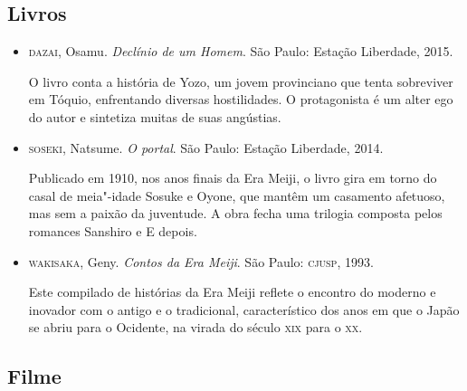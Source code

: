 \documentclass[12pt]{extarticle}
\begin{document}
\subsection{Livros}

\begin{itemize} \item\textsc{dazai}, Osamu. \textit{Declínio de um Homem}. São
      Paulo: Estação Liberdade, 2015.

O livro conta a história de Yozo, um jovem provinciano que tenta sobreviver em
    Tóquio, enfrentando diversas hostilidades. O protagonista é um alter ego do
    autor e sintetiza muitas de suas angústias.

\item\textsc{soseki}, Natsume. \textit{O portal}. São Paulo: Estação Liberdade,
  2014.

Publicado em 1910, nos anos finais da Era Meiji, o livro gira em torno do casal
    de meia"-idade Sosuke e Oyone, que mantêm um casamento afetuoso, mas sem a
    paixão da juventude. A obra fecha uma trilogia composta pelos romances
    Sanshiro e E depois.

\item\textsc{wakisaka}, Geny. \textit{Contos da Era Meiji}. São Paulo:
  \textsc{cjusp}, 1993.

Este compilado de histórias da Era Meiji reflete o encontro do moderno e
inovador com o antigo e o tradicional, característico dos anos em que o Japão
se abriu para o Ocidente, na virada do século \textsc{xix} para o \textsc{xx}.
\end{itemize}

\subsection{Filme}
\end{document}
